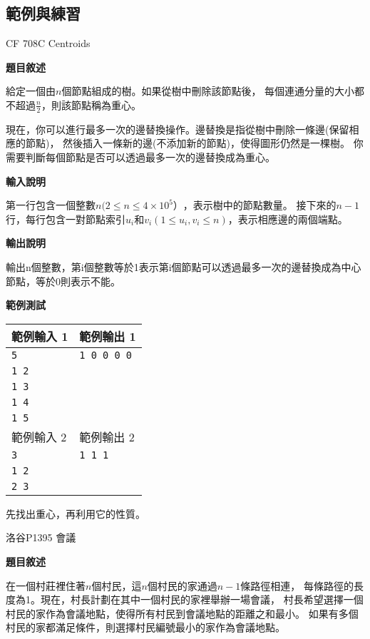     \subsection{範例與練習}

    \problem CF 708C Centroids

    \textbf{題目敘述}

    給定一個由$n$個節點組成的樹。如果從樹中刪除該節點後，
    每個連通分量的大小都不超過$\frac{n}{2}$，則該節點稱為重心。

    現在，你可以進行最多一次的邊替換操作。邊替換是指從樹中刪除一條邊(保留相應的節點)，
    然後插入一條新的邊(不添加新的節點)，使得圖形仍然是一棵樹。
    你需要判斷每個節點是否可以透過最多一次的邊替換成為重心。

    \textbf{輸入說明}

    第一行包含一個整數$n(2 \le n \le 4 \times 10^5）$，表示樹中的節點數量。
    接下來的$n-1$行，每行包含一對節點索引$u_i$和$v_i(1 \le u_i, v_i \le n)$，表示相應邊的兩個端點。
    
    \textbf{輸出說明}

    輸出n個整數，第i個整數等於1表示第i個節點可以透過最多一次的邊替換成為中心節點，等於0則表示不能。

    \textbf{範例測試}

    \begin{tabular}{|m{7cm}|m{7cm}|}
        \hline
        範例輸入 1 & 範例輸出 1 \\
        \hline
        \verb|5|  & \verb|1 0 0 0 0| \\
        \verb|1 2| & \\
        \verb|1 3|  & \\
        \verb|1 4|  & \\
        \verb|1 5|  & \\
        \hline
        範例輸入 2 & 範例輸出 2 \\
        \hline
        \verb|3|  & \verb|1 1 1| \\
        \verb|1 2| & \\
        \verb|2 3|  & \\
        \hline
    \end{tabular}

    \begin{tip}
        先找出重心，再利用它的性質。
    \end{tip}

    \problem 洛谷P1395 會議

    \textbf{題目敘述}

    在一個村莊裡住著$n$個村民，這$n$個村民的家通過$n-1$條路徑相連，
    每條路徑的長度為1。現在，村長計劃在其中一個村民的家裡舉辦一場會議，
    村長希望選擇一個村民的家作為會議地點，使得所有村民到會議地點的距離之和最小。
    如果有多個村民的家都滿足條件，則選擇村民編號最小的家作為會議地點。


